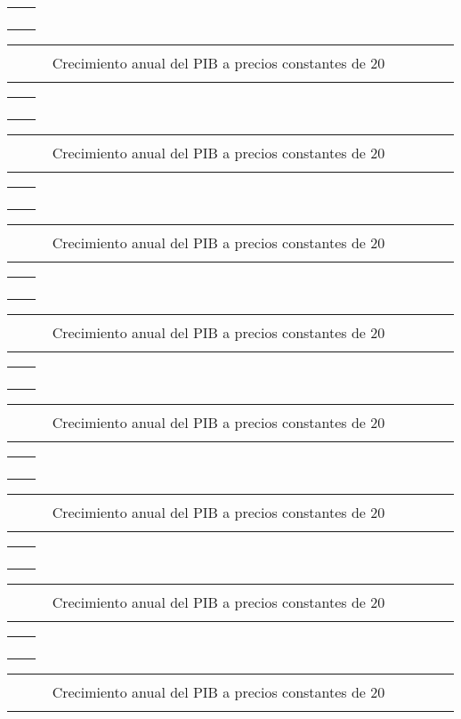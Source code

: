 \documentclass[12pt,letterpaper,twoside]{book}
\newcommand{\guiop}{}
\newcommand{\guicl}{}
\newlength{\distx}
\newcommand{\sectitle}{}
\newcounter{secnumber}[chapter]
\newcommand{\secnew}[1]{\stepcounter{secnumber}\renewcommand{\sectitle}{#1} \section{#1} { \raisebox{0pt}{\begin{titulo-subseccion-blanco} \Bold\large\sectitle\vphantom{p}\end{titulo-subseccion-blanco}}\\[-0.35cm]}}
\newcommand{\secnumbering}{{\large\Bold \thechapter.\thesecnumber}}
\newcommand{\hoja}[1]{\noindent\begin{fondo} #1 \end{fondo}\clearpage}
\newcommand{\cajita}[7]{\checkoddpage\ifoddpage
\begin{bloque-media}
\begin{titulo}
\begin{centrador}
	\begin{tabular}{p{2.5\distx}p{28.8\distx}}
	 & \\[-3mm]	
	 & {\begin{titulo-subseccion}\begin{numero-subseccion}\secnumbering \end{numero-subseccion}  \phantomsection{\secnew{#1}}  \end{titulo-subseccion}}  \\[-5mm]
	 &  \\[-1.3pt]
	\end{tabular}
\end{centrador}
\end{titulo}

\begin{tabular}{p{11\distx}p{21\distx}p{5\distx}}
		\begin{descripcion}
			#2
		\end{descripcion} 
	& 
		\begin{columna-central}
			\begin{subtitulo}
				\centering\footnotesize{\Bold #3} \\
				$\qquad\,\,$#4$\qquad\,\,$
			\end{subtitulo}
	
			\begin{grafica}\centering
				#5
			\end{grafica}
	
			\begin{fuente}
				\footnotesize #6 
			\end{fuente}
		\end{columna-central}
	& 
		\begin{columna-marginal}
			\begin{vacio1}
			
			\end{vacio1}
		
			\begin{nota}
				#7
			\end{nota}
		
			\begin{vacio2}
			
			\end{vacio2}
		\end{columna-marginal}
	\\
\end{tabular}
\end{bloque-media}
\else
\begin{bloque-media}
\begin{titulo}
\begin{centrador-par}
	\begin{tabular}{p{2.5\distx}p{28.8\distx}}
	 & \\[-3mm]	
	 & {\begin{titulo-subseccion}\begin{numero-subseccion}\centering\secnumbering\end{numero-subseccion}  \phantomsection{\secnew{#1}}  \end{titulo-subseccion}}  \\[-5mm]
	 &  \\[-1.3pt]
	\end{tabular}
\end{centrador-par}
\end{titulo}

\begin{tabular}{p{5\distx}p{21.36\distx}p{11\distx}}
		\begin{columna-marginal}
			\begin{vacio1}
			
			\end{vacio1}
		
			\begin{nota}
				#7
			\end{nota}
		
			\begin{vacio2}
			
			\end{vacio2}
		\end{columna-marginal}		
	& 
		\begin{columna-central}
			\begin{subtitulo}
				\centering\footnotesize{\Bold #3} \\
				$\qquad\,\,$#4$\qquad\,\,$
			\end{subtitulo}
	
			\begin{grafica}\centering
				#5
			\end{grafica}
	
			\begin{fuente}
				\footnotesize #6 
			\end{fuente}
		\end{columna-central}
	& 
		\begin{descripcion}
			#2
		\end{descripcion} 
	\\
\end{tabular}
\end{bloque-media}
\fi
}
\begin{document}
\hoja{
	\cajita{Producto Interno Bruto}{}{Crecímiento anual del PIB a precios constantes de 2001Crecimiento anual del PIB a precios constantes de 20}{ Crecimiento anual del PIB a precios constantes de 20}{\ \\[-4mm]\begin{tikzpicture}[x=1pt,y=1pt]
		
		\end{tikzpicture}} {Fuente: Banco de Guatemala \guiop BANGUAT \guicl)}{ }
	
	\cajita{Producto Interno Bruto}{}{Crecimiento anual del PIB a precios constantes de 2001Crecimiento anual del PIB a precios constantes de 20}{ Crecimiento anual del PIB a precios constantes de 20}{\ \\[-4mm]\begin{tikzpicture}[x=1pt,y=1pt]
		
		\end{tikzpicture}} {Fuente: Banco de Guatemala \guiop BANGUAT \guicl)}{ }
	
}

\hoja{
	\cajita{Producto Interno Bruto}{}{Crecímiento anual del PIB a precios constantes de 2001Crecimiento anual del PIB a precios constantes de 20}{ Crecimiento anual del PIB a precios constantes de 20}{\ \\[-4mm]\begin{tikzpicture}[x=1pt,y=1pt]
		
		\end{tikzpicture}} {Fuente: Banco de Guatemala \guiop BANGUAT \guicl)}{ }
	
	\cajita{Producto Interno Bruto}{}{Crecimiento anual del PIB a precios constantes de 2001Crecimiento anual del PIB a precios constantes de 20}{ Crecimiento anual del PIB a precios constantes de 20}{\ \\[-4mm]\begin{tikzpicture}[x=1pt,y=1pt]
		
		\end{tikzpicture}} {Fuente: Banco de Guatemala \guiop BANGUAT \guicl)}{ }
	
}






%
\end{document}
